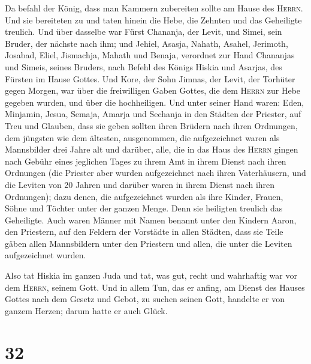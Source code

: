  Da befahl der König, dass man Kammern zubereiten sollte
am Hause des \textsc{Herrn}. Und sie bereiteten zu  und
taten hinein die Hebe, die Zehnten und das Geheiligte treulich. Und über
dasselbe war Fürst Chananja, der Levit, und Simei, sein Bruder, der
nächste nach ihm;  und Jehiel, Asasja, Nahath, Asahel,
Jerimoth, Josabad, Eliel, Jismachja, Mahath und Benaja, verordnet zur
Hand Chananjas und Simeis, seines Bruders, nach Befehl des Königs Hiskia
und Asarjas, des Fürsten im Hause Gottes.  Und Kore, der
Sohn Jimnas, der Levit, der Torhüter gegen Morgen, war über die
freiwilligen Gaben Gottes, die dem \textsc{Herrn} zur Hebe gegeben
wurden, und über die hochheiligen.  Und unter seiner Hand
waren: Eden, Minjamin, Jesua, Semaja, Amarja und Sechanja in den Städten
der Priester, auf Treu und Glauben, dass sie geben sollten ihren Brüdern
nach ihren Ordnungen, dem jüngsten wie dem ältesten, 
ausgenommen, die aufgezeichnet waren als Mannsbilder drei Jahre alt und
darüber, alle, die in das Haus des \textsc{Herrn} gingen nach Gebühr
eines jeglichen Tages zu ihrem Amt in ihrem Dienst nach ihren Ordnungen
 (die Priester aber wurden aufgezeichnet nach ihren
Vaterhäusern, und die Leviten von 20 Jahren und darüber waren in ihrem
Dienst nach ihren Ordnungen);  dazu denen, die
aufgezeichnet wurden als ihre Kinder, Frauen, Söhne und Töchter unter
der ganzen Menge. Denn sie heiligten treulich das Geheiligte.
 Auch waren Männer mit Namen benannt unter den Kindern
Aaron, den Priestern, auf den Feldern der Vorstädte in allen Städten,
dass sie Teile gäben allen Mannsbildern unter den Priestern und allen,
die unter die Leviten aufgezeichnet wurden.

 Also tat Hiskia im ganzen Juda und tat, was gut, recht
und wahrhaftig war vor dem \textsc{Herrn}, seinem Gott. 
Und in allem Tun, das er anfing, am Dienst des Hauses Gottes nach dem
Gesetz und Gebot, zu suchen seinen Gott, handelte er von ganzem Herzen;
darum hatte er auch Glück.

\hypertarget{section-31}{%
\section{32}\label{section-31}}

